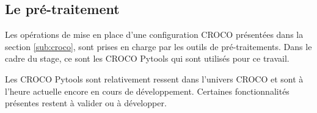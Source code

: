 \documentclass[10pt,a4paper,titlepage]{article}
\begin{document}

\subsection{Le pré-traitement}
\label{sub:outils_pretraitement}

Les opérations de mise en place d'une configuration CROCO présentées dans la section \ref{sub:croco}, sont prises en charge par les outils de pré-traitements. Dans le cadre du stage, ce sont les CROCO Pytools qui sont utilisés pour ce travail.




Les CROCO Pytools sont relativement ressent dans l'univers CROCO et sont à l'heure actuelle encore en cours de développement. %
Certaines fonctionnalités présentes restent à valider ou à développer.


\end{document}
